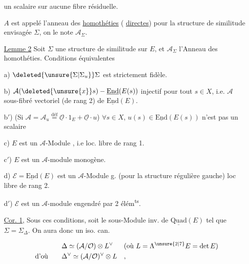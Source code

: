 
un scalaire sur aucune fibre résiduelle.

$A$ est appelé l'anneau des \uline{homothéties} ( \uline{directes})  pour la structure de similitude envisagée $\Sigma$, on le note $\mathcal A_\Sigma$.

\uline{Lemme 2} Soit $\Sigma$ une structure de similitude sur $E$, et $\mathcal A_\Sigma$  l'Anneau des homothéties. Conditions équivalentes

a) $\deleted{\unsure{\Sigma|\Sigma_u}}\Sigma$ est strictement fidèle.

b)  $\mathcal A(\deleted{\unsure{x}}s)-\underline{\mathrm{End}}(E(s))$ injectif pour tout $s\in X$, i.e. $\mathcal A$ sous-fibré vectoriel (de rang 2) de $\underline{\mathrm{End}}(E)$.

b$'$) (Si $\mathcal A=\mathcal A_u\overset{\mathrm{déf}}{=}\underline{\mathcal O}\cdot1_E+\underline{\mathcal O}\cdot u$) $\forall s\in X$, $u(s)\in\underline{\mathrm{End}}(E(s))$ n'est pas un scalaire

c) $E$ est un $\mathcal A$-Module  , i.e loc. libre de rang 1.

c$'$) $E$ est un $\mathcal A$-module  monogène.

d) $\mathcal E=\underline{\mathrm{End}}(E)$ est un $\mathcal A$-Module  g. (pour la structure régulière gauche) loc libre de rang 2.

d$'$) $\mathcal E$ est un $\mathcal A$-module  engendré par 2 élém\textsuperscript{ts}.

\uline{Cor. 1}, Sous ces conditions, soit   le sous-Module  inv. de $\underline{\mathrm{Quad}}(E)$ tel que $\Sigma=\Sigma_\Delta$. On aura donc un iso. can.

\[
\begin{aligned}
&\Delta\simeq(\mathcal A/\mathcal O)\otimes L^\vee &&(\text{où } L=\Lambda^{\unsure{2|7}}E=\det E)\\
\text{d'où}\qquad&\Delta^\vee\simeq(\mathcal A/\mathcal O)^\vee\otimes L&&,
\end{aligned}
\]
